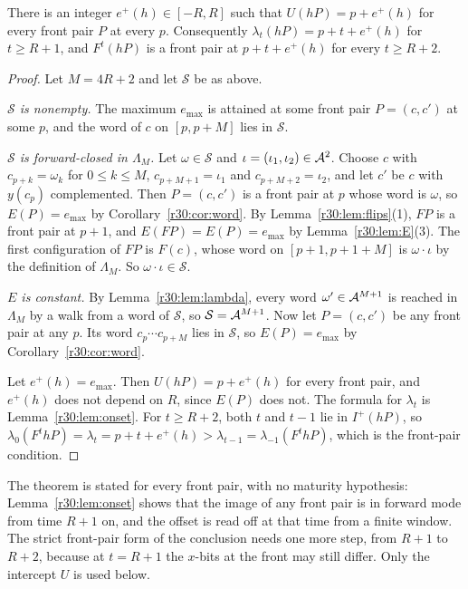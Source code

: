 \begin{theorem}\label{r30:thm:front}
There is an integer $e^+(h)\in[-R,R]$ such that $U(hP)=p+e^+(h)$ for every front pair $P$ at every $p$. Consequently $\lambda_t(hP)=p+t+e^+(h)$ for $t\ge R+1$, and $F^t(hP)$ is a front pair at $p+t+e^+(h)$ for every $t\ge R+2$.
\end{theorem}

\begin{proof}
Let $M=4R+2$ and let $\mathcal{S}$ be as above.

\emph{$\mathcal{S}$ is nonempty.} The maximum $e_{\max}$ is attained at some front pair $P=(c,c')$ at some $p$, and the word of $c$ on $[p,p+M]$ lies in $\mathcal{S}$.

\emph{$\mathcal{S}$ is forward-closed in $\Lambda_M$.} Let $\omega\in\mathcal{S}$ and $\iota=(\iota_1,\iota_2)\in\mathcal{A}^2$. Choose $c$ with $c_{p+k}=\omega_k$ for $0\le k\le M$, $c_{p+M+1}=\iota_1$ and $c_{p+M+2}=\iota_2$, and let $c'$ be $c$ with $y(c_p)$ complemented. Then $P=(c,c')$ is a front pair at $p$ whose word is $\omega$, so $E(P)=e_{\max}$ by Corollary~\ref{r30:cor:word}. By Lemma~\ref{r30:lem:flips}(1), $FP$ is a front pair at $p+1$, and $E(FP)=E(P)=e_{\max}$ by Lemma~\ref{r30:lem:E}(3). The first configuration of $FP$ is $F(c)$, whose word on $[p+1,p+1+M]$ is $\omega\cdot\iota$ by the definition of $\Lambda_M$. So $\omega\cdot\iota\in\mathcal{S}$.

\emph{$E$ is constant.} By Lemma~\ref{r30:lem:lambda}, every word $\omega'\in\mathcal{A}^{M+1}$ is reached in $\Lambda_M$ by a walk from a word of $\mathcal{S}$, so $\mathcal{S}=\mathcal{A}^{M+1}$. Now let $P=(c,c')$ be any front pair at any $p$. Its word $c_p\cdots c_{p+M}$ lies in $\mathcal{S}$, so $E(P)=e_{\max}$ by Corollary~\ref{r30:cor:word}.

Let $e^+(h)=e_{\max}$. Then $U(hP)=p+e^+(h)$ for every front pair, and $e^+(h)$ does not depend on $R$, since $E(P)$ does not. The formula for $\lambda_t$ is Lemma~\ref{r30:lem:onset}. For $t\ge R+2$, both $t$ and $t-1$ lie in $I^+(hP)$, so $\lambda_0(F^thP)=\lambda_t=p+t+e^+(h)>\lambda_{t-1}=\lambda_{-1}(F^thP)$, which is the front-pair condition.
\end{proof}

\begin{remark}
The theorem is stated for every front pair, with no maturity hypothesis: Lemma~\ref{r30:lem:onset} shows that the image of any front pair is in forward mode from time $R+1$ on, and the offset is read off at that time from a finite window. The strict front-pair form of the conclusion needs one more step, from $R+1$ to $R+2$, because at $t=R+1$ the $x$-bits at the front may still differ. Only the intercept $U$ is used below.
\end{remark}


